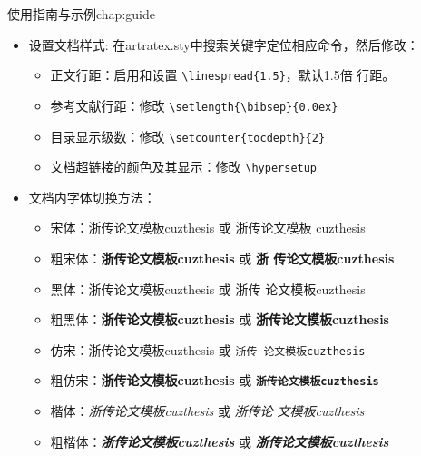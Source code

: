 \begin{cuzchapter}{使用指南与示例}{chap:guide}
\begin{itemize}
        \item 设置文档样式: 在artratex.sty中搜索关键字定位相应命令，然后修改：
              \begin{itemize}
                  \item 正文行距：启用和设置 \verb|\linespread{1.5}|，默认1.5倍
                        行距。
                  \item 参考文献行距：修改 \verb|\setlength{\bibsep}{0.0ex}|
                  \item 目录显示级数：修改 \verb|\setcounter{tocdepth}{2}|
                  \item 文档超链接的颜色及其显示：修改 \verb|\hypersetup|
              \end{itemize}
        \item 文档内字体切换方法：
              \begin{itemize}
                  \item 宋体：浙传论文模板cuzthesis 或 \textrm{浙传论文模板
                            cuzthesis}
                  \item 粗宋体：{\bfseries 浙传论文模板cuzthesis} 或 \textbf{浙
                            传论文模板cuzthesis}
                  \item 黑体：{\sffamily 浙传论文模板cuzthesis} 或 \textsf{浙传
                            论文模板cuzthesis}
                  \item 粗黑体：{\bfseries\sffamily 浙传论文模板cuzthesis} 或
                        \textsf{\bfseries 浙传论文模板cuzthesis}
                  \item 仿宋：{\ttfamily 浙传论文模板cuzthesis} 或 \texttt{浙传
                            论文模板cuzthesis}
                  \item 粗仿宋：{\bfseries\ttfamily 浙传论文模板cuzthesis} 或
                        \texttt{\bfseries 浙传论文模板cuzthesis}
                  \item 楷体：{\itshape 浙传论文模板cuzthesis} 或 \textit{浙传论
                            文模板cuzthesis}
                  \item 粗楷体：{\bfseries\itshape 浙传论文模板cuzthesis} 或
                        \textit{\bfseries 浙传论文模板cuzthesis}
              \end{itemize}
    \end{itemize}

\end{cuzchapter}
